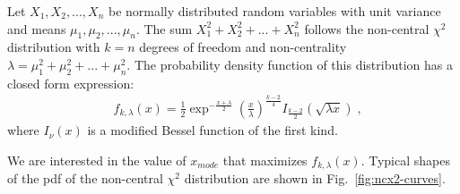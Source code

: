 \documentclass[final,5p,twocolumn,times,authoryear]{elsarticle}
\begin{document}
Let $X_1, X_2, ..., X_n$ be normally distributed random variables with unit variance and means $\mu_1, \mu_2, ..., \mu_n$. The sum $X_1^2 + X_2^2 + ... + X_n^2$ follows the non-central $\chi^2$ distribution with $k = n$ degrees of freedom and non-centrality $\lambda = \mu_1^2 + \mu_2^2 + ... + \mu_n^2$. The probability density function of this distribution has a closed form expression:
%
\begin{align}
    &f_{k, \lambda}(x) = \frac{1}{2} \exp^{-\frac{x + \lambda}{2}} \left(\frac{x}{\lambda}\right)^{\frac{k-2}{4}} I_{\frac{k-2}{2}}(\sqrt{\lambda x})\;,
\end{align}
%
where $I_{\nu}(x)$ is a modified Bessel function of the first kind.

We are interested in the value of $x_{mode}$ that maximizes $f_{k, \lambda}(x)$. Typical shapes of the pdf of the non-central $\chi^2$ distribution are shown in Fig.~\ref{fig:ncx2-curves}.
\end{document}

